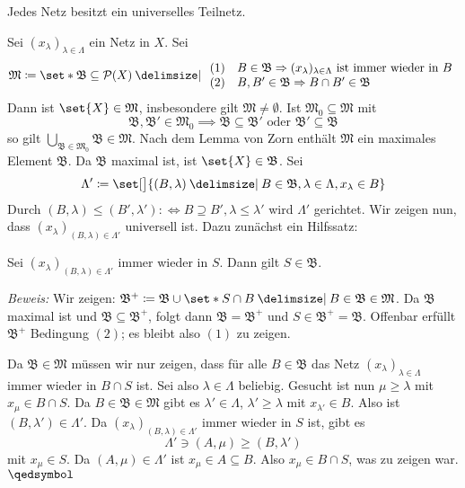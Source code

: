 \begin{proposition}[{name=[Jedes Netz besitzt ein universelles Teilnetz]},label=prop:exis-univ-netze]
	Jedes Netz besitzt ein universelles Teilnetz.
\end{proposition}
\begin{beweis}
	Sei $(x_\lambda )_{\lambda  \in \Lambda}$ ein Netz in $X$. Sei 
	\[
		\mathfrak{M} \coloneqq \set*{\mathfrak{B} \subseteq \mathcal{P}(X) \given 
		\begin{array}{ll}
			(1) & B \in \mathfrak{B} \Rightarrow (x_\lambda )_{\lambda  \in \Lambda} \text{ ist immer wieder in } B \\
			(2) & B, B' \in \mathfrak{B} \Rightarrow B \cap B' \in \mathfrak{B}
		\end{array}
		} 
	\]
	Dann ist $\set{X} \in \mathfrak{M}$, insbesondere gilt $\mathfrak{M} \neq \emptyset$. 
	Ist $\mathfrak{M}_0 \subseteq \mathfrak{M}$ mit 
	\[
		\mathfrak{B}, \mathfrak{B}' \in \mathfrak{M}_0 \implies \mathfrak{B} \subseteq \mathfrak{B}' \text{ oder } \mathfrak{B'} \subseteq \mathfrak{B}
	\]
	so gilt $\bigcup_{\mathfrak{B \in \mathfrak{M}_0}} \mathfrak{B} \in \mathfrak{M}$. 
	Nach dem Lemma von Zorn enthält $\mathfrak{M}$ ein maximales Element $\mathfrak{B}$. 
	Da $\mathfrak{B}$ maximal ist, ist $\set{X} \in \mathfrak{B}$. 
	Sei 
	\[
		\Lambda' \coloneqq \set[\big]{(B,\lambda ) \given B \in \mathfrak{B}, \lambda \in \Lambda, x_\lambda  \in B}
	\]
	Durch $(B,\lambda ) \le (B', \lambda ') :\Leftrightarrow B \supseteq B', \lambda  \le \lambda '$ wird $\Lambda'$ gerichtet.
	Wir zeigen nun, dass $(x_\lambda )_{(B,\lambda)  \in \Lambda'}$ universell ist.
	Dazu zunächst ein Hilfssatz:
	
	Sei $(x_\lambda )_{(B,\lambda)  \in \Lambda'}$ immer wieder in $S$. Dann gilt $S \in \mathfrak{B}$. 
	
	\emph{Beweis:} Wir zeigen: $\mathfrak{B}^+ \coloneqq \mathfrak{B} \cup \set*{S \cap B \given B \in \mathfrak{B}}  \in \mathfrak{M}$. 
	Da $\mathfrak{B}$ maximal ist und $\mathfrak{B} \subseteq \mathfrak{B}^+$, folgt dann $\mathfrak{B} = \mathfrak{B}^+$ und $S \in \mathfrak{B}^+ =\mathfrak{B}$. 
	Offenbar erfüllt $\mathfrak{B}^+$ Bedingung $(2)$; es bleibt also $(1)$ zu zeigen.
	
	Da $\mathfrak{B} \in \mathfrak{M}$ müssen wir nur zeigen, dass für alle $B \in \mathfrak{B}$ das Netz $(x_\lambda )_{\lambda \in \Lambda}$ immer wieder in $B \cap S$ ist. 
	Sei also $\lambda \in \Lambda$ beliebig. 
	Gesucht ist nun $\mu \ge \lambda $ mit $x_\mu \in B \cap S$. 
	Da $B \in \mathfrak{B} \in \mathfrak{M}$ gibt es $\lambda' \in \Lambda$, $\lambda' \ge \lambda $ mit $x_{\lambda'} \in B$. Also ist $(B, \lambda') \in \Lambda'$. 
	Da $(x_\lambda )_{(B,\lambda) \in \Lambda'}$ immer wieder in $S$ ist, gibt es
	\[
		\Lambda' \ni (A, \mu) \ge (B,\lambda ')
	\]
	mit $x_{\mu} \in S$. 
	Da $(A,\mu) \in \Lambda'$ ist $x_\mu \in A \subseteq B$. 
	Also $x_\mu \in B \cap S$, was zu zeigen war. $\qedsymbol$ 
	

\end{beweis}
